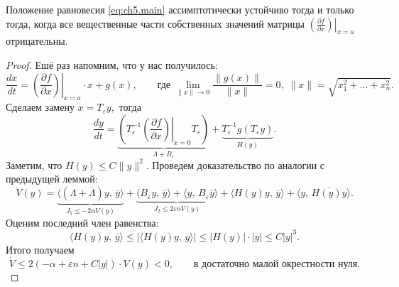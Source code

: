 \begin{theorem}
        Положение равновесия \eqref{eq:ch5.main} ассимптотически устойчиво тогда и только тогда, когда все вещественные части собственных значений матрицы
$
        \left.\left(
          \frac
            {\partial f}
            {\partial x}
        \right)\right|_{x = a}
$
        отрицательны.
\end{theorem}
\begin{proof}
        Ешё раз напомним, что у нас получилось:
$$
        \frac
          {dx}
          {dt}
=
          \left.\left(
            \frac
              {\partial f}
              {\partial x}
          \right)\right|_{x = a}
          \cdot
          x
        +
          g(x),
\qquad
        \mbox{где }
        \lim\limits_{\|x\|\to 0}
          \frac
            {\|g(x)\|}
            {\|x\|}
=
        0,
\;
        \|x\|
=
        \sqrt{x_1^2 + \ldots + x_n^2}.
$$
Сделаем замену
$
        x = T_\varepsilon y,
$
тогда
$$
        \frac
          {dy}
          {dt}
=
      \underbrace{
        \left(
          T_\varepsilon^{-1}
          \left.\left(
            \frac
              {\partial f}
              {\partial x}
          \right)\right|_{x = 0}
          T_\varepsilon
        \right)
      }_{\Lambda + B_\varepsilon}
        +
      \underbrace{
        T_\varepsilon^{-1}
        g(T_\varepsilon y)
      }_{H(y)}.
$$
Заметим, что $H(y) \leqslant C\|y\|^2$. Проведем доказательство по аналогии с предыдущей леммой:
$$
        \dot V(y)
=        
      \underbrace{
        \langle
            (
                \Lambda
              +
                \overline{\Lambda}
            )
            y
          ,\,
            \overline y
        \rangle
      }_{J_1 \leqslant -2 \alpha V(y)}
        + 
      \underbrace{
        \langle
            B_\varepsilon y
          ,\, 
            \overline y 
        \rangle
        + 
        \langle
            y
          ,\,
            B_\varepsilon\overline y
        \rangle
      }_{J_2 \leqslant 2 \varepsilon n V(y)}
        +
        \langle
            H(y)y
          ,\,
            \overline y
        \rangle
        +
        \langle
            y
          ,\,
            \overline{H(y)y}
        \rangle.
$$
Оценим последний член равенства:
$$
        \langle
            H(y)y
          ,\,
            \overline y
        \rangle
\leqslant
        |\langle
            H(y)y
          ,\,
            \overline y
        \rangle|
\leqslant
        |H(y)|
        \cdot
        |y|
\leqslant
        C|y|^3.
$$
Итого получаем
$$
        \dot V
\leqslant
        2(-
          \alpha
          +
          \varepsilon
          n
          +
          C
          |y|
          )
        \cdot
        V(y) < 0,
\qquad
        \mbox{в достаточно малой окрестности нуля.}
$$
\end{proof}


